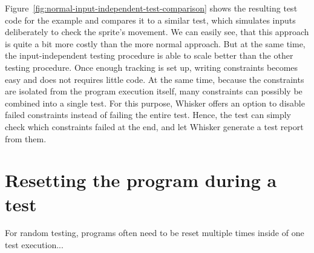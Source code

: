 Figure~\ref{fig:normal-input-independent-test-comparison} shows the resulting test code for the example
and compares it to a similar test, which simulates inputs deliberately to check the sprite's movement.
We can easily see, that this approach is quite a bit more costly than the more normal approach.
But at the same time, the input-independent testing procedure is able to scale better than the other testing procedure.
Once enough tracking is set up, writing constraints becomes easy and does not requires little code.
At the same time, because the constraints are isolated from the program execution itself,
many constraints can possibly be combined into a single test.
For this purpose, Whisker offers an option to disable failed constraints instead of failing the entire test.
Hence, the test can simply check which constraints failed at the end, and let Whisker generate a test report from them.

\section{Resetting the program during a test}

%
%
%
%
%
%

For random testing, programs often need to be reset multiple times inside of one test execution...

